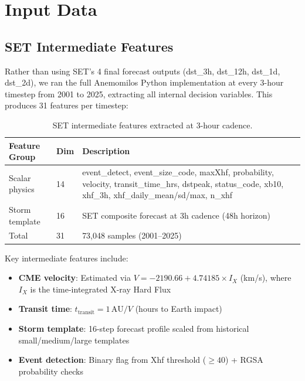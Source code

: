 \documentclass[11pt,a4paper]{article}
\begin{document}
\section{Input Data}

\subsection{SET Intermediate Features}

Rather than using SET's 4 final forecast outputs (dst\_3h, dst\_12h, dst\_1d, dst\_2d), we ran the full Anemomilos Python implementation at every 3-hour timestep from 2001 to 2025, extracting all internal decision variables. This produces 31 features per timestep:

\begin{table}[H]
\centering
\caption{SET intermediate features extracted at 3-hour cadence.}
\label{tab:set_features}
\begin{tabular}{llp{7cm}}
\toprule
\textbf{Feature Group} & \textbf{Dim} & \textbf{Description} \\
\midrule
Scalar physics & 14 & event\_detect, event\_size\_code, maxXhf, probability, velocity, transit\_time\_hrs, dstpeak, status\_code, xb10, xhf\_3h, xhf\_daily\_mean/sd/max, n\_xhf \\
Storm template & 16 & SET composite forecast at 3h cadence (48h horizon) \\
\midrule
Total & 31 & 73,048 samples (2001--2025) \\
\bottomrule
\end{tabular}
\end{table}

Key intermediate features include:
\begin{itemize}[nosep]
    \item \textbf{CME velocity}: Estimated via $V = -2190.66 + 4.74185 \times I_X$ (km/s), where $I_X$ is the time-integrated X-ray Hard Flux
    \item \textbf{Transit time}: $t_{\text{transit}} = 1\,\text{AU} / V$ (hours to Earth impact)
    \item \textbf{Storm template}: 16-step forecast profile scaled from historical small/medium/large templates
    \item \textbf{Event detection}: Binary flag from Xhf threshold ($\geq 40$) + RGSA probability checks
\end{itemize}
\end{document}
